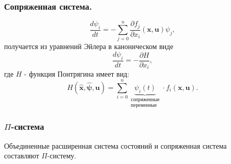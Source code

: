 \subsubsection{Сопряженная система.}
\begin{equation*}
	\frac{d\psi_i}{dt} = -\sum_{j=0}^{n}\frac{\partial f_j}{\partial x_i}(\mathbf{x}, \mathbf{u})\psi_j,
\end{equation*}
получается из уравнений Эйлера в каноническом виде
\begin{equation*}
	\frac{d\psi_i}{dt} = - \frac{\partial H}{\partial x_i},
\end{equation*}
где $H$ - функция Понтрягина имеет вид:
\begin{equation*}
	H(\hat{\mathbf{x}},\hat{\mathbf{\psi}}, \mathbf{u})=\sum_{i=0}^{n}\underbrace{\psi_i(t)}_{\substack{\text{сопряженные}\\\text{переменные}}}\cdot f_i(\mathbf{x},\mathbf{u}).
\end{equation*}

\subsubsection{$\Pi$-система}
Объединенные расширенная система состояний и сопряженная система составляют $\Pi$-систему.